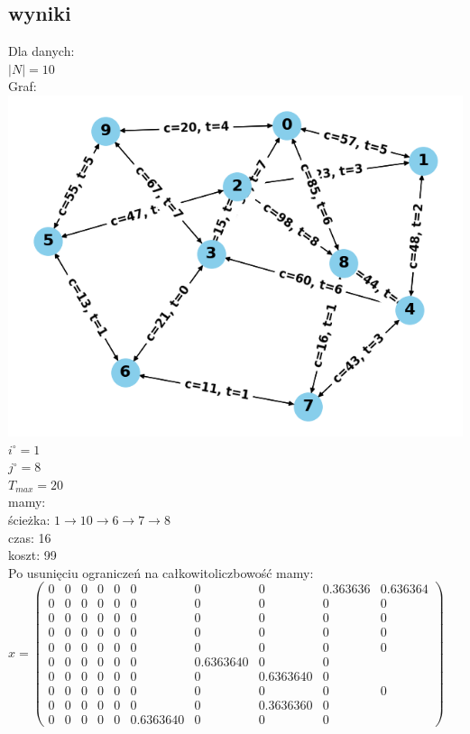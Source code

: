 \documentclass{report}
\begin{document}
\subsection*{wyniki}
Dla danych:\\
$|N| = 10$\\
Graf:\\
\includegraphics*[scale=0.58]{../graph.png}\\
$i^\circ = 1$\\
$j^\circ = 8$\\
$T_{max} = 20$\\
mamy:\\
ścieżka: $1 \rightarrow 10 \rightarrow 6 \rightarrow 7 \rightarrow 8$\\
czas: 16\\
koszt: 99\\
Po usunięciu ograniczeń na całkowitoliczbowość mamy:\\
$x = \begin{pmatrix}
 0 & 0 &  0 &  0 &  0 &  0 &       0 &       0 &       0.363636 & 0.636364\\
 0 & 0 &  0 &  0 &  0 &  0 &       0 &       0 &       0 &       0\\
 0 & 0 &  0 &  0 &  0 &  0 &       0 &       0 &       0 &       0\\
 0 & 0 &  0 &  0 &  0 &  0 &       0 &       0 &       0 &       0\\
 0 & 0 &  0 &  0 &  0 &  0 &       0 &       0 &       0 &       0\\
 0 &  0 &  0 &  0 &  0 &  0 &       0.636364  0 &       0 &       0\\
 0 &  0 &  0 &  0 &  0 &  0 &       0 &       0.636364  0 &       0\\
 0 &  0 &  0 &  0 &  0 &  0 &       0 &       0 &       0 &       0\\
 0 &  0 &  0 &  0 &  0 &  0 &       0 &       0.363636  0 &       0\\
 0 &  0 &  0 &  0 &  0 &  0.636364  0 &       0 &       0 &       0
\end{pmatrix}$\\
\end{document}
